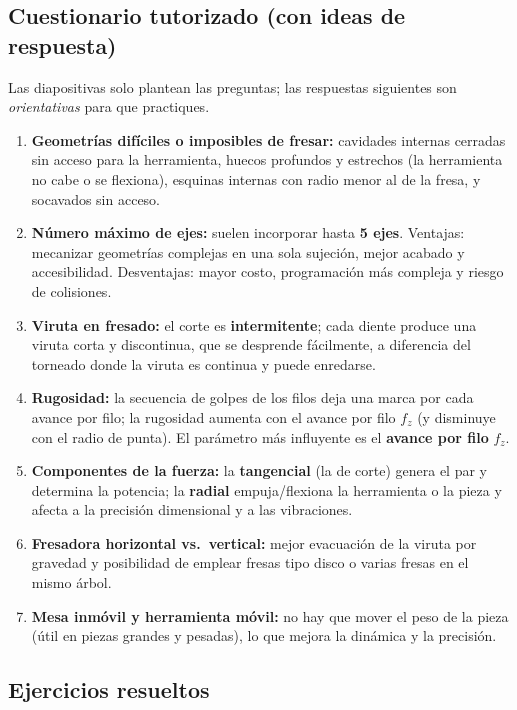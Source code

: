 \documentclass[12pt,a4paper]{article}
\begin{document}
\subsection{Cuestionario tutorizado (con ideas de respuesta)}
Las diapositivas solo plantean las preguntas; las respuestas siguientes son
\emph{orientativas} para que practiques.
\begin{enumerate}
	\item \textbf{Geometrías difíciles o imposibles de fresar:} cavidades internas
	      cerradas sin acceso para la herramienta, huecos profundos y estrechos
	      (la
	      herramienta no cabe o se flexiona), esquinas internas con radio menor al
	      de la
	      fresa, y socavados sin acceso.
	\item \textbf{Número máximo de ejes:} suelen incorporar hasta \textbf{5 ejes}.
	      Ventajas: mecanizar geometrías complejas en una sola sujeción, mejor
	      acabado y
	      accesibilidad. Desventajas: mayor costo, programación más compleja y
	      riesgo de
	      colisiones.
	\item \textbf{Viruta en fresado:} el corte es \textbf{intermitente}; cada
	      diente produce una viruta corta y discontinua, que se desprende
	      fácilmente, a
	      diferencia del torneado donde la viruta es continua y puede enredarse.
	\item \textbf{Rugosidad:} la secuencia de golpes de los filos deja una marca
	      por cada avance por filo; la rugosidad aumenta con el avance por filo
	      $f_z$ (y
	      disminuye con el radio de punta). El parámetro más influyente es el
	      \textbf{avance por filo} $f_z$.
	\item \textbf{Componentes de la fuerza:} la \textbf{tangencial} (la de corte)
	      genera el par y determina la potencia; la \textbf{radial}
	      empuja/flexiona la
	      herramienta o la pieza y afecta a la precisión dimensional y a las
	      vibraciones.
	\item \textbf{Fresadora horizontal vs.\ vertical:} mejor evacuación de la
	      viruta por gravedad y posibilidad de emplear fresas tipo disco o varias
	      fresas
	      en el mismo árbol.
	\item \textbf{Mesa inmóvil y herramienta móvil:} no hay que mover el peso de
	      la pieza (útil en piezas grandes y pesadas), lo que mejora la dinámica y
	      la
	      precisión.
\end{enumerate}

\subsection{Ejercicios resueltos}
\end{document}
